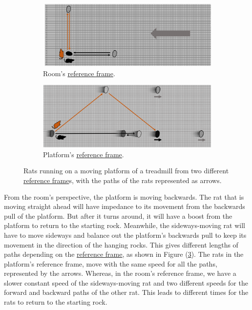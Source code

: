\begin{figure}[H]
	\centering
	\begin{subfigure}{0.9\textwidth}
		\centering
		\includegraphics[width = \textwidth]{images/pdf/rats_moving.pdf}
		\caption{Room's \protect\hyperlink{def-Reference-frame}{reference frame}.}
		\label{fig: rat with moving platform}
	\end{subfigure}
	\begin{subfigure}{0.9\textwidth}
		\vspace{0.2cm}
		\centering
		\includegraphics[width = \textwidth]{images/pdf/rats_platform_frame.pdf}
		\caption{Platform's \protect\hyperlink{def-Reference-frame}{reference frame}.}
		\label{fig: rat platform reference frame}
	\end{subfigure}
	\caption{Rats running on a moving platform of a treadmill from two different \protect\hyperlink{def-Reference-frame}{reference frame}s, with the paths of the rats represented as arrows.}
	\label{fig: treadmill}
\end{figure}

From the room's perspective, the platform is moving backwards.
The rat that is moving straight ahead will have impedance to its movement from the backwards pull of the platform.
But after it turns around, it will have a boost from the platform to return to the starting rock.
Meanwhile, the sideways-moving rat will have to move sideways and balance out the platform's backwards pull to keep its movement in the direction of the hanging rocks.
This gives different lengths of paths depending on the \hyperlink{def-Reference-frame}{reference frame}, as shown in Figure (\ref{fig: treadmill}).
The rats in the platform's reference frame, move with the same speed for all the paths, represented by the arrows.
Whereas, in the room's reference frame, we have a slower constant speed of the sideways-moving rat and two different speeds for the forward and backward paths of the other rat.
This leads to different times for the rats to return to the starting rock.

